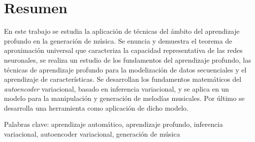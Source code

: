 %


\chapter{Resumen}

En este trabajo se estudia la aplicación de técnicas del ámbito del aprendizaje profundo en la generación de música. Se enuncia y demuestra el teorema de aproximación universal que caracteriza la capacidad representativa de las redes neuronales, se realiza un estudio de los fundamentos del aprendizaje profundo, las técnicas de aprendizaje profundo para la modelización de datos secuenciales y el aprendizaje de características. Se desarrollan los fundamentos matemáticos del \textit{autoencoder} variacional, basado en inferencia variacional, y se aplica en un modelo para la manipulación y generación de melodías musicales. Por último se desarrolla una herramienta como aplicación de dicho modelo.

Palabras clave: aprendizaje automático, aprendizaje profundo, inferencia variacional, autoencoder variacional, generación de música

\endinput
